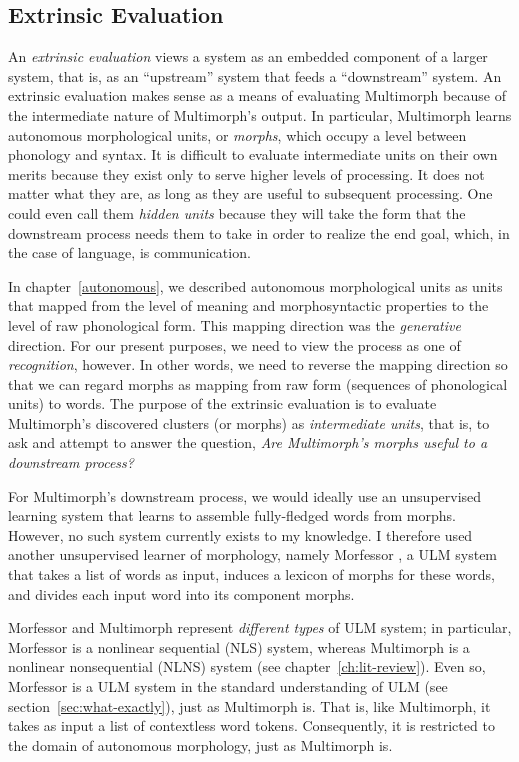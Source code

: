 {\subsection{Extrinsic Evaluation} \label{sec:eval-extrinsic} An \emph{extrinsic evaluation} 
views a system as an embedded component of a larger system, that is, as an ``upstream'' system that feeds a ``downstream''
system. An extrinsic evaluation makes sense as a means of evaluating Multimorph because of the intermediate nature of Multimorph's output. In particular, Multimorph  learns autonomous morphological units, or \emph{morphs}, which occupy a level between phonology and syntax. %
It is difficult to evaluate intermediate units on their own merits because they exist only to serve higher levels of processing. 
It does not matter what they are, as long as they are useful to subsequent processing. 
One could even call them \emph{hidden units} because they will take the form that 
the downstream process needs them to take in order to realize the end goal, which, in the case of language, is communication.

In chapter~\ref{autonomous}, we described autonomous morphological units as units that mapped from the level of meaning and morphosyntactic properties to the level of raw phonological form. This mapping direction was the \emph{generative} direction. For our present purposes, we need to view the process as one of \emph{recognition}, however. In other words, we need to reverse the mapping direction so that we can regard morphs as mapping from raw form (sequences of phonological units) to words. 
The purpose of the extrinsic evaluation is to evaluate Multimorph's discovered clusters (or morphs) as \emph{intermediate units}, that is, to ask and attempt to answer the question, \emph{Are Multimorph's morphs useful to a downstream process?}

For Multimorph's downstream process, we would ideally use an unsupervised learning system that learns to assemble fully-fledged words from morphs. However, no such system currently exists to my knowledge. I therefore used another unsupervised learner of morphology, namely Morfessor \citep{creutz:2003, creutz-and-lagus:2005, creutz-et-al:2006, creutz-and-lagus:2007}, a ULM
system that takes a list of words as input, induces a lexicon of morphs 
for these words, and divides each input word into its component morphs.

Morfessor and Multimorph represent \emph{different types} of ULM system; 
in particular, Morfessor is a nonlinear sequential (NLS) system, whereas Multimorph is a nonlinear nonsequential (NLNS) system (see chapter~\ref{ch:lit-review}). 
Even so, Morfessor is a ULM system in the standard understanding of ULM (see section~\ref{sec:what-exactly}), just as Multimorph is. 
That is, like Multimorph, it takes as input a list of contextless word tokens. Consequently, it is restricted to the domain of autonomous morphology, just as Multimorph is.

}
